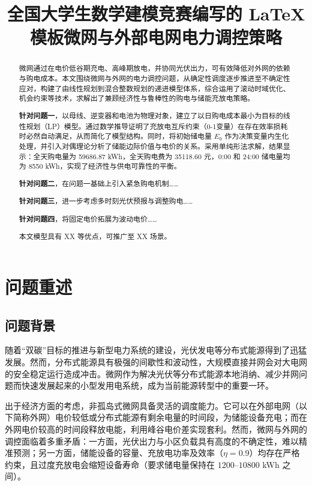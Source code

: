 \documentclass[withoutpreface,bwprint]{cumcmthesis} %
\title{全国大学生数学建模竞赛编写的 \LaTeX{} 模板}
\title{微网与外部电网电力调控策略}
\begin{document}
\maketitle

\begin{abstract}
微网通过在电价低谷期充电、高峰期放电，并协同光伏出力，可有效降低对外网的依赖与购电成本。本文围绕微网与外网的电力调控问题，从确定性调度逐步推进至不确定性应对，构建了由线性规划到混合整数规划的递进模型体系，综合运用了滚动时域优化、机会约束等技术，求解出了兼顾经济性与鲁棒性的购电与储能充放电策略。

\textbf{针对问题一}，以母线、逆变器和电池为物理对象，建立了以日购电成本最小为目标的线性规划（LP）模型。通过数学推导证明了充放电互斥约束（0-1变量）在存在效率损耗时必然自动满足，从而简化了模型结构。同时，将初始储电量 \(E_0\) 作为决策变量内生化处理，并引入对偶理论分析了储能边际价值与电价的关系。采用单纯形法求解，结果显示：全天购电量为 59686.87 kWh，全天购电费为 35118.60 元，0:00 和 24:00 储电量均为 8550 kWh，实现了经济性与供电可靠性的平衡。

\textbf{针对问题二}，在问题一基础上引入紧急购电机制……

\textbf{针对问题三}，进一步考虑多时刻光伏预报与调整购电……

\textbf{针对问题四}，将固定电价拓展为波动电价……

本文模型具有 XX 等优点，可推广至 XX 场景。

\end{abstract}

\section{问题重述}
\subsection{问题背景}
随着“双碳”目标的推进与新型电力系统的建设，光伏发电等分布式能源得到了迅猛发展。然而，分布式能源具有极强的间歇性和波动性，大规模直接并网会对大电网的安全稳定运行造成冲击。微网作为解决光伏等分布式能源本地消纳、减少并网问题而快速发展起来的小型发用电系统，成为当前能源转型中的重要一环。

出于经济方面的考虑，非孤岛式微网具备灵活的调度能力。它可以在外部电网（以下简称外网）电价较低或分布式能源有剩余电量的时间段，为储能设备充电；而在外网电价较高的时间段释放电能，利用峰谷电价差实现套利。然而，微网与外网的调控面临着多重矛盾：一方面，光伏出力与小区负载具有高度的不确定性，难以精准预测；另一方面，储能设备的容量、充放电功率及效率（\(\eta=0.9\)）均存在严格约束，且过度充放电会缩短设备寿命（要求储电量保持在 \(1200\text{--}10800\) kWh 之间）。
\end{document}
